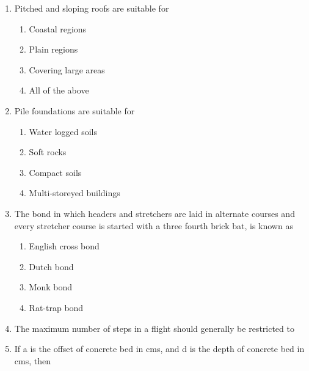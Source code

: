 \documentclass[11pt,a4paper]{article}
\begin{document}
\begin{enumerate}
\\
\item{Pitched and sloping roofs are suitable for}
\begin{enumerate}[label=\Alph*.]
\item{Coastal regions}
\item{Plain regions}
\item{Covering large areas}
\item{All of the above}
\end{enumerate}
\item{Pile foundations are suitable for}
\begin{enumerate}[label=\Alph*.]
\item{Water logged soils}
\item{Soft rocks}
\item{Compact soils}
\item{Multi-storeyed buildings}
\end{enumerate}
\item{The bond in which headers and stretchers are laid in alternate courses and every stretcher course is started with a three fourth brick bat, is known as}
\begin{enumerate}[label=\Alph*.]
\item{English cross bond}
\item{Dutch bond}
\item{Monk bond}
\item{Rat-trap bond}
\end{enumerate}
\item{The maximum number of steps in a flight should generally be restricted to}
\\
\item{If a is the offset of concrete bed in cms, and d is the depth of concrete bed in cms, then}
\\\begin{enumerate*}[itemjoin=\qquad, label=\Alph*.]

\end{enumerate*}
\end{enumerate}
\end{document}
